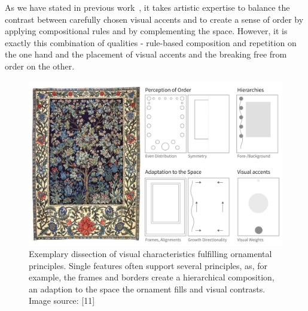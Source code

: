 
As we have stated in previous work~\cite{gieseke_2017_ooo}, it takes artistic expertise to balance the contrast between carefully chosen visual accents and to create a sense of order by applying compositional rules and by complementing the space. However, it is exactly this combination of qualities - rule-based composition and repetition on the one hand and the placement of visual accents and the breaking free from order on the other.


\begin{figure}
       \includegraphics[width=1\columnwidth]{figures/ornament/ornament_principles.jpg}
               \caption[Ornamentation principles]{\label{fig:ornamentation_principles} Exemplary dissection of visual characteristics fulfilling ornamental principles. Single features often support several principles, as, for example, the frames and borders create a hierarchical composition, an adaption to the space the ornament fills and visual contrasts. Image source:  [11]}
\end{figure}


